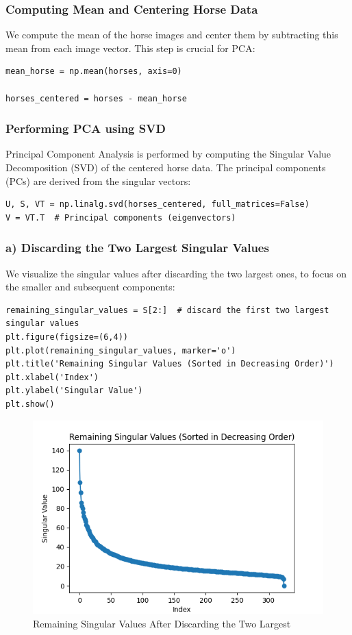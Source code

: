 \documentclass{article}
\begin{document}
\subsubsection*{Computing Mean and Centering Horse Data}

We compute the mean of the horse images and center them by subtracting this mean from each image vector. This step is crucial for PCA:

\begin{verbatim}
mean_horse = np.mean(horses, axis=0)

horses_centered = horses - mean_horse
\end{verbatim}

\subsubsection*{Performing PCA using SVD}

Principal Component Analysis is performed by computing the Singular Value Decomposition (SVD) of the centered horse data. The principal components (PCs) are derived from the singular vectors:

\begin{verbatim}
U, S, VT = np.linalg.svd(horses_centered, full_matrices=False)
V = VT.T  # Principal components (eigenvectors)
\end{verbatim}

\subsubsection*{a) Discarding the Two Largest Singular Values}

We visualize the singular values after discarding the two largest ones, to focus on the smaller and subsequent components:

\begin{verbatim}
remaining_singular_values = S[2:]  # discard the first two largest singular values
plt.figure(figsize=(6,4))
plt.plot(remaining_singular_values, marker='o')
plt.title('Remaining Singular Values (Sorted in Decreasing Order)')
plt.xlabel('Index')
plt.ylabel('Singular Value')
plt.show()
\end{verbatim}

\begin{figure}[h]
    \centering
    \includegraphics[width=.6\textwidth]{remaining_singular_values.png}
    \caption{Remaining Singular Values After Discarding the Two Largest}
    \label{fig:remaining_singular_values}
\end{figure}
\end{document}
